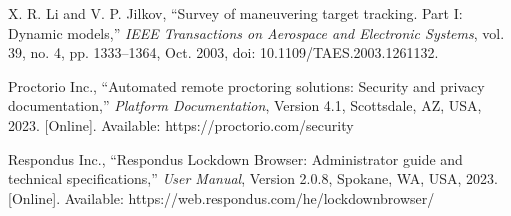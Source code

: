 \documentclass[conference]{IEEEtran}
\begin{document}
\begin{thebibliography}{99}
X. R. Li and V. P. Jilkov, ``Survey of maneuvering target tracking. Part I: Dynamic models,'' \textit{IEEE Transactions on Aerospace and Electronic Systems}, vol. 39, no. 4, pp. 1333--1364, Oct. 2003, doi: 10.1109/TAES.2003.1261132.

Proctorio Inc., ``Automated remote proctoring solutions: Security and privacy documentation,'' \textit{Platform Documentation}, Version 4.1, Scottsdale, AZ, USA, 2023. [Online]. Available: https://proctorio.com/security

Respondus Inc., ``Respondus Lockdown Browser: Administrator guide and technical specifications,'' \textit{User Manual}, Version 2.0.8, Spokane, WA, USA, 2023. [Online]. Available: https://web.respondus.com/he/lockdownbrowser/

\end{thebibliography}
\end{document}
